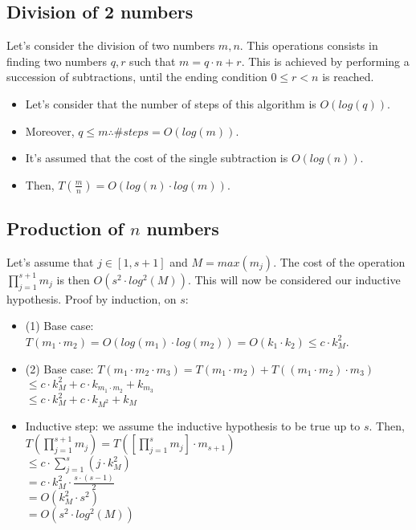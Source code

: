\subsection{Division of 2 numbers}
Let's consider the division of two numbers $m, n$. This operations consists in \\ finding two numbers $q, r$ such that $m = q \cdot n + r$. \newline
This is achieved by performing a succession of subtractions, until the ending condition $0 \leq r < n$ is reached. \newline
\begin{itemize}
    \item Let's consider that the number of steps of this algorithm is $O(log(q))$.
    \item Moreover, $q \leq m \therefore \#steps = O(log(m))$.
    \item It's assumed that the cost of the single subtraction is $O(log(n))$.
    \item Then, $T(\frac{m}{n}) = O(log(n) \cdot log(m))$.
\end{itemize}

\subsection{Production of $n$ numbers}
Let's assume that $j \in [1, s+1]$ and $M = max(m_{j})$. \newline
The cost of the operation $\prod_{j = 1}^{s+1} m_{j}$ is then $O(s^{2} \cdot log^{2}(M))$. This will now be considered our inductive hypothesis.\newline
Proof by induction, on $s$:
\begin{itemize}
    \item (1) Base case: $T(m_{1} \cdot m_{2}) = O(log(m_{1}) \cdot log(m_{2})) = O(k_{1} \cdot k_{2}) \leq c \cdot k_{M}^{2}$.
    \item (2) Base case: $T(m_{1} \cdot m_{2} \cdot m_{3}) = T(m_{1} \cdot m_{2}) + T((m_{1} \cdot m_{2}) \cdot m_{3})$ \\ $\leq c \cdot k_{M}^{2} + c \cdot k_{m_{1} \cdot m_{2}} + k_{m_{3}}$ \\ $\leq c \cdot k_{M}^{2} + c \cdot k_{M^{2}} + k_{M}$
    \item Inductive step: we assume the inductive hypothesis to be true up to $s$. Then,
    \\ $T(\prod_{j = 1}^{s+1} m_{j}) = T([\prod_{j = 1}^{s} m_{j}] \cdot m_{s+1})$
    \\ $\leq c \cdot \sum_{j=1}^{s} (j \cdot k_{M}^{2})$
    \\ $= c \cdot k_{M}^{2} \cdot \frac{s \cdot (s-1)}{2}$
    \\ $= O(k_{M}^{2} \cdot s^{2})$
    \\ $= O(s^{2} \cdot log^{2}(M))$
\end{itemize}
